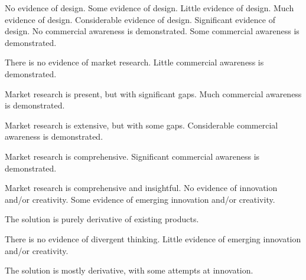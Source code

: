 \documentclass{../fal_assignment}
\begin{document}
	\begin{markingrubric}
		\grade\fail No evidence of design.
		\grade Some evidence of design.
		\grade Little evidence of design.
		\grade Much evidence of design.
		\grade Considerable evidence of design.
		\grade Significant evidence of design.
		\grade\fail No commercial awareness is demonstrated.
		\grade Some commercial awareness is demonstrated.
		\par There is no evidence of market research.
		\grade Little commercial awareness is demonstrated.
		\par Market research is present, but with significant gaps.
		\grade Much commercial awareness is demonstrated.
		\par Market research is extensive, but with some gaps.
		\grade Considerable commercial awareness is demonstrated.
		\par Market research is comprehensive.
		\grade Significant commercial awareness is demonstrated.
		\par Market research is comprehensive and insightful.
		\grade\fail No evidence of innovation and/or creativity.
		\grade Some evidence of emerging innovation and/or creativity.
		\par The solution is purely derivative of existing products.
		\par There is no evidence of divergent thinking.
		\grade Little evidence of emerging innovation and/or creativity.
		\par The solution is mostly derivative, with some attempts at innovation.

\end{markingrubric}
\end{document}
